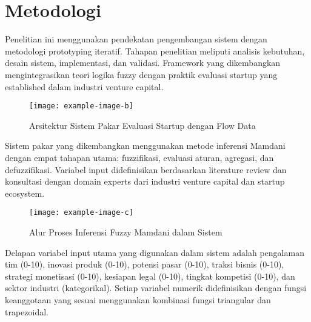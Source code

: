 \documentclass[12pt,a4paper]{article}
\begin{document}
\section{Metodologi}

Penelitian ini menggunakan pendekatan pengembangan sistem dengan metodologi prototyping iteratif. Tahapan penelitian meliputi analisis kebutuhan, desain sistem, implementasi, dan validasi. Framework yang dikembangkan mengintegrasikan teori logika fuzzy dengan praktik evaluasi startup yang established dalam industri venture capital.

\begin{figure}[htbp] %
    \centering
    \texttt{[image: example-image-b]} %
    \caption{Arsitektur Sistem Pakar Evaluasi Startup dengan Flow Data}
    \label{fig:architecture}
\end{figure}

Sistem pakar yang dikembangkan menggunakan metode inferensi Mamdani dengan empat tahapan utama: fuzzifikasi, evaluasi aturan, agregasi, dan defuzzifikasi. Variabel input didefinisikan berdasarkan literature review dan konsultasi dengan domain experts dari industri venture capital dan startup ecosystem.

\begin{figure}[htbp] %
    \centering
    \texttt{[image: example-image-c]} %
    \caption{Alur Proses Inferensi Fuzzy Mamdani dalam Sistem}
    \label{fig:fuzzy-flow}
\end{figure}

Delapan variabel input utama yang digunakan dalam sistem adalah pengalaman tim (0-10), inovasi produk (0-10), potensi pasar (0-10), traksi bisnis (0-10), strategi monetisasi (0-10), kesiapan legal (0-10), tingkat kompetisi (0-10), dan sektor industri (kategorikal). Setiap variabel numerik didefinisikan dengan fungsi keanggotaan yang sesuai menggunakan kombinasi fungsi triangular dan trapezoidal.
\end{document}
